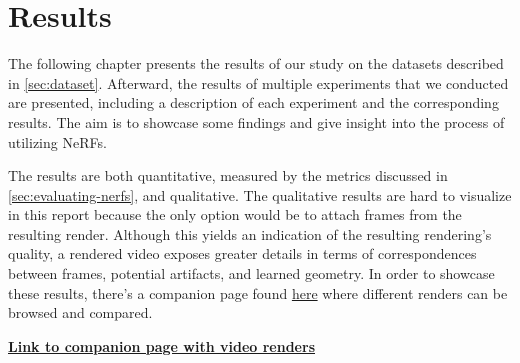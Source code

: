 \chapter{Results}

The following chapter presents the results of our study on the datasets described in \autoref{sec:dataset}. Afterward, the results of multiple experiments that we conducted are presented, including a description of each experiment and the corresponding results. The aim is to showcase some findings and give insight into the process of utilizing NeRFs.

The results are both quantitative, measured by the metrics discussed in \autoref{sec:evaluating-nerfs}, and qualitative. The qualitative results are hard to visualize in this report because the only option would be to attach frames from the resulting render. Although this yields an indication of the resulting rendering's quality, a rendered video exposes greater details in terms of correspondences between frames, potential artifacts, and learned geometry. In order to showcase these results, there's a companion page found \href{https://absorbing-peace-5f6.notion.site/NeRF-Renders-1260636ed8e44f8e8e4d45bd9fc6dda4#1edb5c8c9f86444db1902a18243b6e51}{here} where different renders can be browsed and compared.

\vspace{5mm} %
\noindent \textbf{\href{https://absorbing-peace-5f6.notion.site/NeRF-Renders-1260636ed8e44f8e8e4d45bd9fc6dda4\#1edb5c8c9f86444db1902a18243b6e51}{Link to companion page with video renders}}

